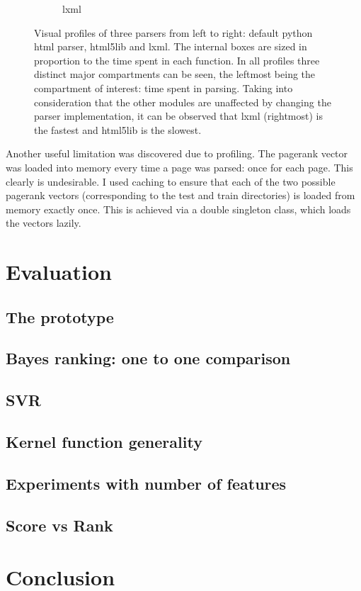 \documentclass[12pt,twoside,notitlepage]{report}
\begin{document}
\begin{figure}
\begin{subfigure}[b]{.3\textwidth}
  \caption{lxml}
  \label{lxml}
\end{subfigure}
\caption{Visual profiles of three parsers from left to right: default python
html parser, html5lib and lxml. The internal boxes are sized in proportion to
the time spent in each function. In all profiles three distinct major
compartments can be seen, the leftmost being the compartment of interest: 
time spent in parsing. Taking into consideration that the other modules are unaffected by changing the parser
implementation, it can be observed that lxml (rightmost) is the fastest and
html5lib is the slowest.\label{parsers}}
\end{figure}

Another useful limitation was discovered due to profiling. The pagerank vector
was loaded into memory every time a page was parsed: once for each page. This
clearly is undesirable. I used caching to ensure that each of the two possible
pagerank vectors (corresponding to the test and train directories) is loaded
from memory exactly once. This is achieved via a double singleton class, which
loads the vectors lazily.
\cleardoublepage
\chapter{Evaluation}
\section{The prototype}
\section{Bayes ranking: one to one comparison}
\section{SVR}
\section{Kernel function generality}
\section{Experiments with number of features}
\section{Score vs Rank}

\cleardoublepage
\chapter{Conclusion}
\cleardoublepage
\end{document}
